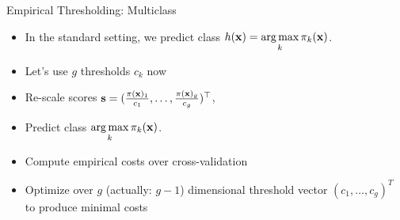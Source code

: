 \documentclass[11pt,compress,t,notes=noshow, xcolor=table]{beamer}
\begin{document}
\begin{frame}{Empirical Thresholding: Multiclass}
    \begin{itemize}
        
        
            \item In the standard setting, we predict class $h(\mathbf{x}) = \mathop{\mathrm{arg\,max}}\limits_{k} \pi_{k}(\mathbf{x})$.
            
            \item Let's use $g$ thresholds $c_k$ now 
            
            \item Re-scale scores $ \mathbf{s} = (\frac{\pi(\mathbf{x})_1}{c_1},\ldots, \frac{\pi(\mathbf{x})_g}{ c_g})^\top$, 
            \item Predict class $\mathop{\mathrm{arg\,max}}\limits_k \pi_{k}(\mathbf{x}) $.

            \item Compute empirical costs over cross-validation

            \item Optimize over $g$ (actually: $g-1$) dimensional threshold vector $(c_1, \ldots, c_g)^T$ to produce minimal costs

    \end{itemize}
\end{frame}

%
%                   
%
\end{document}
